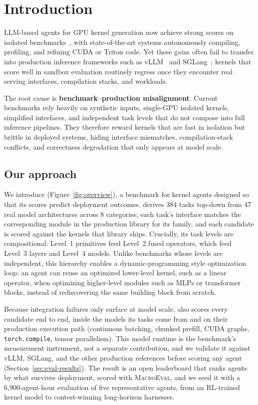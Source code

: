 \section{Introduction}
\label{sec:introduction}

LLM-based agents for GPU kernel generation now achieve strong scores on isolated benchmarks~\citep{kernelbench, solexecbench, flashinferbench}, with state-of-the-art systems autonomously compiling, profiling, and refining CUDA or Triton code.
Yet these gains often fail to transfer into production inference frameworks such as vLLM~\citep{vllm} and SGLang~\citep{sglang}: kernels that score well in sandbox evaluation routinely regress once they encounter real serving interfaces, compilation stacks, and workloads.

The root cause is \textbf{benchmark--production misalignment}.
Current benchmarks rely heavily on synthetic inputs, single-GPU isolated kernels, simplified interfaces, and independent task levels that do not compose into full inference pipelines.
They therefore reward kernels that are fast in isolation but brittle in deployed systems, hiding interface mismatches, compilation-stack conflicts, and correctness degradation that only appears at model scale.

\subsection*{Our approach}

We introduce \fastkernels{} (Figure~\ref{fig:overview}), a benchmark for kernel agents designed so that its scores predict deployment outcomes.
\fastkernels{} derives 384 tasks top-down from 47 real model architectures across 8 categories; each task's interface matches the corresponding module in the production library for its family, and each candidate is scored against the kernels that library ships.
Crucially, its task levels are compositional: Level~1 primitives feed Level~2 fused operators, which feed Level~3 layers and Level~4 models.
Unlike benchmarks whose levels are independent, this hierarchy enables a dynamic-programming style optimization loop: an agent can reuse an optimized lower-level kernel, such as a linear operator, when optimizing higher-level modules such as MLPs or transformer blocks, instead of rediscovering the same building block from scratch.

Because integration failures only surface at model scale, \fastkernels{} also scores every candidate end to end, inside the models its tasks come from and on their production execution path (continuous batching, chunked prefill, CUDA graphs, \texttt{torch.compile}, tensor parallelism).
This model runtime is the benchmark's measurement instrument, not a separate contribution, and we validate it against vLLM, SGLang, and the other production references before scoring any agent (Section~\ref{sec:eval-results}).
The result is an open leaderboard that ranks agents by what survives deployment, scored with \textsc{MacroEval}, and we seed it with a 6{,}900-agent-hour evaluation of five representative agents, from an RL-trained kernel model to contest-winning long-horizon harnesses.

